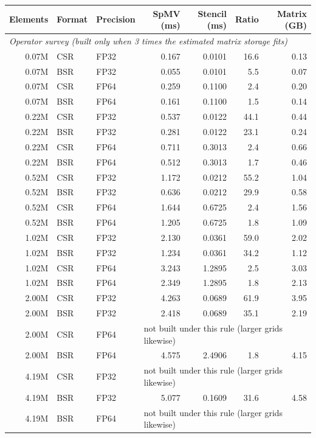 \begin{tabular}{rllrrrr}
\toprule
Elements & Format & Precision & SpMV (ms) & Stencil (ms) & Ratio & Matrix (GB) \\
\midrule
\multicolumn{7}{l}{\emph{Operator survey (built only when 3 times the estimated matrix storage fits)}} \\
0.07M & CSR & FP32 & 0.167 & 0.0101 & 16.6 & 0.13 \\
0.07M & BSR & FP32 & 0.055 & 0.0101 & 5.5 & 0.07 \\
0.07M & CSR & FP64 & 0.259 & 0.1100 & 2.4 & 0.20 \\
0.07M & BSR & FP64 & 0.161 & 0.1100 & 1.5 & 0.14 \\
0.22M & CSR & FP32 & 0.537 & 0.0122 & 44.1 & 0.44 \\
0.22M & BSR & FP32 & 0.281 & 0.0122 & 23.1 & 0.24 \\
0.22M & CSR & FP64 & 0.711 & 0.3013 & 2.4 & 0.66 \\
0.22M & BSR & FP64 & 0.512 & 0.3013 & 1.7 & 0.46 \\
0.52M & CSR & FP32 & 1.172 & 0.0212 & 55.2 & 1.04 \\
0.52M & BSR & FP32 & 0.636 & 0.0212 & 29.9 & 0.58 \\
0.52M & CSR & FP64 & 1.644 & 0.6725 & 2.4 & 1.56 \\
0.52M & BSR & FP64 & 1.205 & 0.6725 & 1.8 & 1.09 \\
1.02M & CSR & FP32 & 2.130 & 0.0361 & 59.0 & 2.02 \\
1.02M & BSR & FP32 & 1.234 & 0.0361 & 34.2 & 1.12 \\
1.02M & CSR & FP64 & 3.243 & 1.2895 & 2.5 & 3.03 \\
1.02M & BSR & FP64 & 2.349 & 1.2895 & 1.8 & 2.13 \\
2.00M & CSR & FP32 & 4.263 & 0.0689 & 61.9 & 3.95 \\
2.00M & BSR & FP32 & 2.418 & 0.0689 & 35.1 & 2.19 \\
2.00M & CSR & FP64 & \multicolumn{4}{l}{not built under this rule (larger grids likewise)} \\
2.00M & BSR & FP64 & 4.575 & 2.4906 & 1.8 & 4.15 \\
4.19M & CSR & FP32 & \multicolumn{4}{l}{not built under this rule (larger grids likewise)} \\
4.19M & BSR & FP32 & 5.077 & 0.1609 & 31.6 & 4.58 \\
4.19M & BSR & FP64 & \multicolumn{4}{l}{not built under this rule (larger grids likewise)} \\

\end{tabular}
